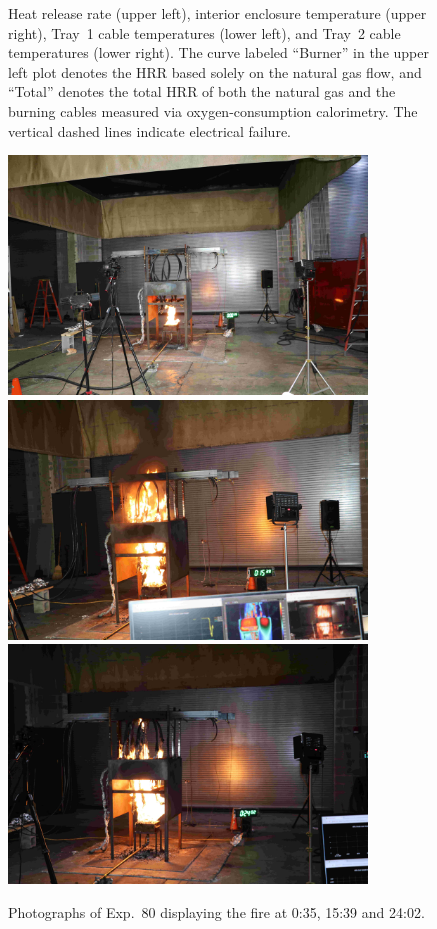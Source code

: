 \begin{figure}[H]
\caption[HRR and temperatures of Exp.~80]{Heat release rate (upper left), interior enclosure temperature (upper right), Tray~1 cable temperatures (lower left), and Tray~2 cable temperatures (lower right). The curve labeled ``Burner'' in the upper left plot denotes the HRR based solely on the natural gas flow, and ``Total'' denotes the total HRR of both the natural gas and the burning cables measured via oxygen-consumption calorimetry. The vertical dashed lines indicate electrical failure.}
\label{fig:Test_80}
\end{figure}

\begin{figure}[p]
\centering
\includegraphics[height=2.50in]{../FIGURES/Test_80_Photo_1} \\ \vspace{0.1in}
\includegraphics[height=2.50in]{../FIGURES/Test_80_Photo_2} \\ \vspace{0.1in}
\includegraphics[height=2.50in]{../FIGURES/Test_80_Photo_3}
\caption[Photographs of Exp.~80]{Photographs of Exp.~80 displaying the fire at 0:35, 15:39 and 24:02.}
\label{fig:Test_80_photos}
\end{figure}



